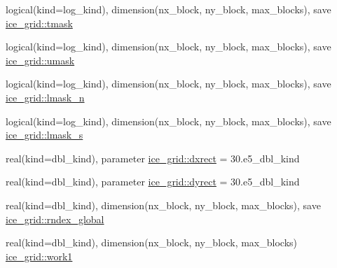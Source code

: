 \begin{DoxyCompactItemize}
logical(kind=log\_\-kind), dimension(nx\_\-block, ny\_\-block, max\_\-blocks), save \hyperlink{namespaceice__grid_a5de6731a3b8601be3495a4c306832bf0}{ice\_\-grid::tmask}
\item 
logical(kind=log\_\-kind), dimension(nx\_\-block, ny\_\-block, max\_\-blocks), save \hyperlink{namespaceice__grid_a02f5ae5edcea6185af4949d9be61cc26}{ice\_\-grid::umask}
\item 
logical(kind=log\_\-kind), dimension(nx\_\-block, ny\_\-block, max\_\-blocks), save \hyperlink{namespaceice__grid_ae9873cb5a374679eb9105cbd0b3adaef}{ice\_\-grid::lmask\_\-n}
\item 
logical(kind=log\_\-kind), dimension(nx\_\-block, ny\_\-block, max\_\-blocks), save \hyperlink{namespaceice__grid_aab33134c872608cbbcb505d3f788bb2d}{ice\_\-grid::lmask\_\-s}
\item 
real(kind=dbl\_\-kind), parameter \hyperlink{namespaceice__grid_aea53b08fccd72dbe7e8a4689ab26534c}{ice\_\-grid::dxrect} = 30.e5\_\-dbl\_\-kind
\item 
real(kind=dbl\_\-kind), parameter \hyperlink{namespaceice__grid_a5c8fd584afc136dde0c222634c2fe240}{ice\_\-grid::dyrect} = 30.e5\_\-dbl\_\-kind
\item 
real(kind=dbl\_\-kind), dimension(nx\_\-block, ny\_\-block, max\_\-blocks), save \hyperlink{namespaceice__grid_ab75f2e02f6911b1eacbb7a0647f947b7}{ice\_\-grid::rndex\_\-global}
\item 
real(kind=dbl\_\-kind), dimension(nx\_\-block, ny\_\-block, max\_\-blocks) \hyperlink{namespaceice__grid_a77ce4807a6b38d81367a3a7d67e2aa7c}{ice\_\-grid::work1}
\end{DoxyCompactItemize}
